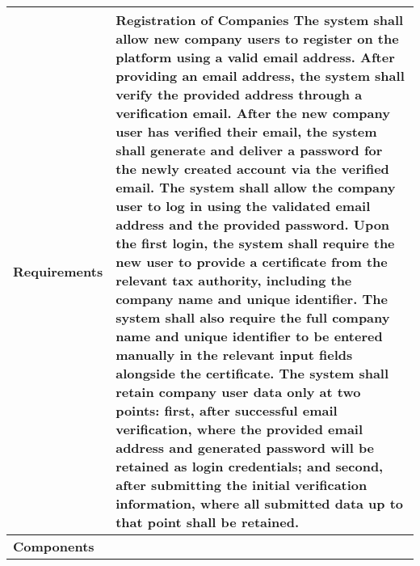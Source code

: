 \begin{table}[h]
    \centering
    \renewcommand{\arraystretch}{1.5} %
    \begin{tabular}{|C{0.3\textwidth}|L{0.65\textwidth}|} %
        \hline
        \textbf{Requirements} &    
         \textbf{Registration of Companies}
         \newline
        [FR4] The system shall allow new company users to register on the platform using a valid email address.
        \newline
        [FR5] After providing an email address, the system shall verify the provided address through a verification email. 
        \newline
        [FR6] After the new company user has verified their email, the system shall generate and deliver a password for the newly created account via the verified email. 
        \newline
        [FR7] The system shall allow the company user to log in using the validated email address and the provided password. 
        \newline
        [FR8] Upon the first login, the system shall require the new user to provide a certificate from the relevant tax authority, including the company name and unique identifier. The system shall also require the full company name and unique identifier to be entered manually in the relevant input fields alongside the certificate. 
        \newline
        [FR9] The system shall retain company user data only at two points: first, after successful email verification, where the provided email address and generated password will be retained as login credentials; and second, after submitting the initial verification information, where all submitted data up to that point shall be retained. 
        \\
        \hline
        \textbf{Components} & 
        \\
        \hline
    \end{tabular}
\end{table}

